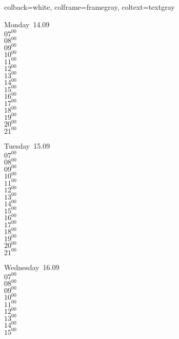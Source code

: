 \documentclass[11pt,a4paper]{book}\usepackage[]{graphicx}\usepackage[]{color}
\begin{document}
{{{{{{{{{{{        colback=white, colframe=framegray, coltext=textgray}
%
\begin{tcolorbox}
Monday~14.09\\
{ 
$07^{00}$\\
$08^{00}$\\
$09^{00}$\\
$10^{00}$\\
$11^{00}$\\
$12^{00}$\\
$13^{00}$\\
$14^{00}$\\
$15^{00}$\\
$16^{00}$\\
$17^{00}$\\
$18^{00}$\\
$19^{00}$\\
$20^{00}$\\
$21^{00}$}\\
\end{tcolorbox}
%
\begin{tcolorbox}
Tuesday~15.09\\
{ 
$07^{00}$\\
$08^{00}$\\
$09^{00}$\\
$10^{00}$\\
$11^{00}$\\
$12^{00}$\\
$13^{00}$\\
$14^{00}$\\
$15^{00}$\\
$16^{00}$\\
$17^{00}$\\
$18^{00}$\\
$19^{00}$\\
$20^{00}$\\
$21^{00}$}\\
\end{tcolorbox}
%
\begin{tcolorbox}
Wednesday~16.09\\
{ 
$07^{00}$\\
$08^{00}$\\
$09^{00}$\\
$10^{00}$\\
$11^{00}$\\
$12^{00}$\\
$13^{00}$\\
$14^{00}$\\
$15^{00}$\\
}
\end{tcolorbox}}}}}}}}}}}
\end{document}
